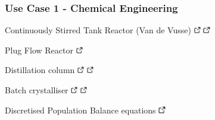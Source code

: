 \documentclass[compress,newPxFont,sthlmFooter]{beamer}
\begin{document}
\begin{frame}[plain]
\frametitle{Use Case 1 - Chemical Engineering}
    \begin{itemize}
       {\small
          \item \alert{Continuously Stirred Tank Reactor} (Van de Vusse)
                \href{https://doi.org/10.1021/i160048a700}{\includegraphics[align=b, height=0.8em]{link.png}} 
                \href{http://daetools.com/docs/tutorials-chemeng.html\#tutorial-che-1}{\includegraphics[align=b, height=0.8em]{link.png}}
          \item \alert{Plug Flow Reactor}
                \href{http://daetools.com/docs/tutorials-chemeng.html\#tutorial-che-7}{\includegraphics[align=b, height=0.8em]{link.png}}
          \item \alert{Distillation column}
                \href{http://dx.doi.org/10.1016/S0098-1354(02)00120-5}{\includegraphics[align=b, height=0.8em]{link.png}} 
                \href{http://daetools.com/docs/tutorials-chemeng.html\#tutorial-che-2}{\includegraphics[align=b, height=0.8em]{link.png}}
          \item \alert{Batch crystalliser}
                \href{http://dx.doi.org/10.1016/j.jcrysgro.2011.06.016}{\includegraphics[align=b, height=0.8em]{link.png}} 
                \href{http://daetools.com/docs/tutorials-chemeng.html\#tutorial-che-3}{\includegraphics[align=b, height=0.8em]{link.png}}
          \item \alert{Discretised Population Balance equations}
                \href{http://dx.doi.org/10.20944/preprints201611.0012.v1}{\includegraphics[align=b, height=0.8em]{link.png}} 
}
\end{itemize}
\end{frame}
\end{document}
